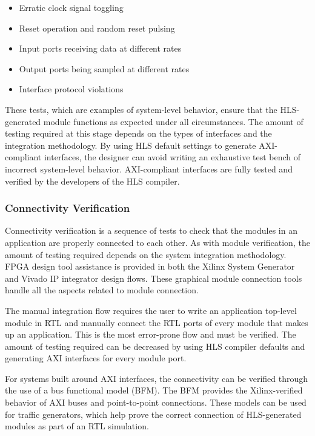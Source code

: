 \begin{itemize}
  \item Erratic clock signal toggling
  \item Reset operation and random reset pulsing
  \item Input ports receiving data at different rates
  \item Output ports being sampled at different rates
  \item Interface protocol violations
\end{itemize}

These tests, which are examples of system-level behavior, ensure that the HLS-generated
module functions as expected under all circumstances. The amount of testing required at
this stage depends on the types of interfaces and the integration methodology. By using
HLS default settings to generate AXI-compliant interfaces, the designer can avoid writing
an exhaustive test bench of incorrect system-level behavior. AXI-compliant interfaces are
fully tested and verified by the developers of the HLS compiler.


\subsubsection{Connectivity Verification}
Connectivity verification is a sequence of tests to check that the modules in an application
are properly connected to each other. As with module verification, the amount of testing
required depends on the system integration methodology. FPGA design tool assistance is provided in both the Xilinx System Generator and Vivado IP
integrator design flows. These graphical module connection tools handle all the aspects
related to module connection. 

\par The manual integration flow requires the user to write an application top-level module in
RTL and manually connect the RTL ports of every module that makes up an application. This
is the most error-prone flow and must be verified. The amount of testing required can be
decreased by using HLS compiler defaults and generating AXI interfaces for every module
port.

\par For systems built around AXI interfaces, the connectivity can be verified through the use of
a bus functional model (BFM). The BFM provides the Xilinx-verified behavior of AXI buses
and point-to-point connections. These models can be used for traffic generators, which
help prove the correct connection of HLS-generated modules as part of an RTL simulation.

